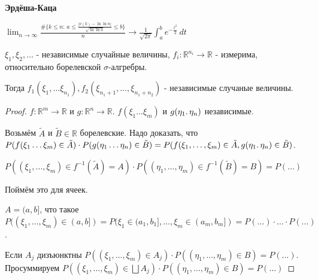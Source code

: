 \begin{theorem}
    \textbf{Эрдёша-Каца}


    $\lim_{n \to \infty} \frac{ \# \{ k \leq n : \, a \leqslant \frac{|\nu (k) - \ln \ln n|}{\sqrt{\ln \ln n}} \leqslant b \} }{n} \rightarrow \frac{1}{\sqrt{2\pi}} \int_{a}^{b} e^{-\frac{t^2}{2}} \, dt $
\end{theorem}


\begin{theorem}
    $\xi_1, \xi_2, \ldots$ - независимые случайные величины, $f_i : \mathbb{R}^{n_i} \to \mathbb{R}$ - измерима,
    относительно борелевской $\sigma$-алгребры.

    Тогда $f_1 (\xi_1, \ldots \xi_{n_1}), f_2(\xi_{n_1 + 1}, \ldots, \xi_{n_1 + n_2})$ - независимые случаные величины.
\end{theorem}

\begin{proof}
    $f : \mathbb{R}^m \to \mathbb{R}$ и $g : \mathbb{R}^n \to \mathbb{R}$. $f(\xi_1 \ldots \xi_m)$ и
    $g(\eta_1 \ldotp \eta_n)$ независимые.

    Возьмём $\tilde{A}$ и $\tilde{B} \in \mathbb{R}$ борелевские. Надо доказать, что
    $P(f(\xi_1 \ldots \xi_m) \in \tilde{A}) \cdot P(g(\eta_1 \ldots \eta_n) \in \tilde{B}) =
    P(f(\xi_1, \ldots, \xi_m) \in \tilde{A}, g(\eta_1 \ldotp \eta_n) \in \tilde{B})$.

    $P((\xi_1, \ldots, \xi_m) \in f^{-1} (\tilde{A}) = A) \cdot P((\eta_1, \ldots, \eta_m) \in f^{-1} (\tilde{B}) = B) = P(\ldots)$

    Поймём это для ячеек.

    $A = (a, b]$, что такое $P((\xi_1, \ldots, \xi_m) \in (a, b]) = P(\xi_1 \in (a_1, b_1], \ldots, \xi_m \in (a_m, b_m]) = P(\ldots) \cdot \ldots \cdot P(\ldots)$.

    Если $A_j$ дизъюнктны $P((\xi_1, \ldots, \xi_m) \in A_j) \cdot P((\eta_1, \ldots, \eta_m) \in B) = P(\ldots).$
    Просуммируем $P((\xi_1, \ldots, \xi_m) \in \bigsqcup A_j) \cdot P((\eta_1, \ldots, \eta_m) \in B) = P(\ldots)$
\end{proof}

